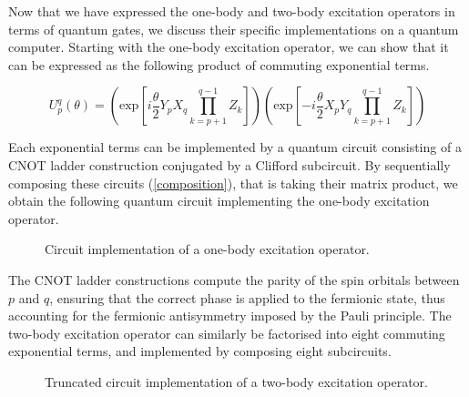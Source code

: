 Now that we have expressed the one-body and two-body excitation operators in terms of quantum gates, we discuss their specific implementations on a quantum computer. Starting with the one-body excitation operator, we can show that it can be expressed as the following product of commuting exponential terms.

\begin{equation*}
    U^q_p (\theta) =
    \left( \text{exp} \left[
    i \frac{\theta}{2} Y_p X_q \prod_{k=p+1}^{q-1} Z_k \right] \right)
    \left( \text{exp} \left[ -
    i \frac{\theta}{2} X_p Y_q \prod_{k=p+1}^{q-1} Z_k \right] \right)
\end{equation*}

Each exponential terms can be implemented by a quantum circuit consisting of a CNOT ladder construction conjugated by a Clifford subcircuit. By sequentially composing these circuits (\ref{composition}), that is taking their matrix product, we obtain the following quantum circuit implementing the one-body excitation operator.





\begin{figure}[H]
    \centering
    \caption{Circuit implementation of a one-body excitation operator.}
    \label{one-body-implementation}
\end{figure}

The CNOT ladder constructions compute the parity of the spin orbitals between $p$ and $q$, ensuring that the correct phase is applied to the fermionic state, thus accounting for the fermionic antisymmetry imposed by the Pauli principle. The two-body excitation operator can similarly be factorised into eight commuting exponential terms, and implemented by composing eight subcircuits.

\begin{figure}[H]
    \centering
    \caption{Truncated circuit implementation of a two-body excitation operator.}
    \label{two-body-implementation}
\end{figure}

